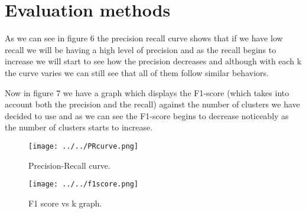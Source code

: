 \documentclass[paper=a4, fontsize=11pt]{scrartcl} %
\begin{document}

\clearpage
\section{Evaluation methods}
As we can see in figure 6 the precision recall curve shows that if we have low recall we will be having a high level of precision and as the recall begins to increase we will start to see how the precision decreases and although with each k the curve varies we can still see that all of them follow similar behaviors.

Now in figure 7 we have a graph which displays the F1-score (which takes into account both the precision and the recall) against the number of clusters we have decided to use and as we can see the F1-score begins to decrease noticeably as the number of clusters starts to increase.
\begin{figure}[h]
	\centering
	\texttt{[image: ../../PRcurve.png]}
	\caption{Precision-Recall curve.}
	\label{fig:scree}
\end{figure}
\begin{figure}[h]
	\centering
	\texttt{[image: ../../f1score.png]}
	\caption{F1 score vs k graph.}
	\label{fig:scree}
\end{figure}



\end{document}
